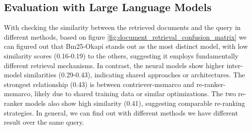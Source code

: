 \subsection{Evaluation with Large Language Models}\label{subsec:evaluation-with-large-language-models}
With checking the similarity between the retrieved documents and the query in different methods, based on figure \ref{fig:document_retrieval_confusion_matrix} we can figured out that Bm25-Okapi stands out as the most distinct model, with low similarity scores (0.16-0.19) to the others, suggesting it employs fundamentally different retrieval mechanisms.
In contrast, the neural models show higher inter-model similarities (0.29-0.43), indicating shared approaches or architectures.
The strongest relationship (0.43) is between contriever-msmarco and re-ranker-msmarco, likely due to shared training data or similar optimizations.
The two re-ranker models also show high similarity (0.41), suggesting comparable re-ranking strategies.
In general, we can find out with different methods we have different result over the same query.

